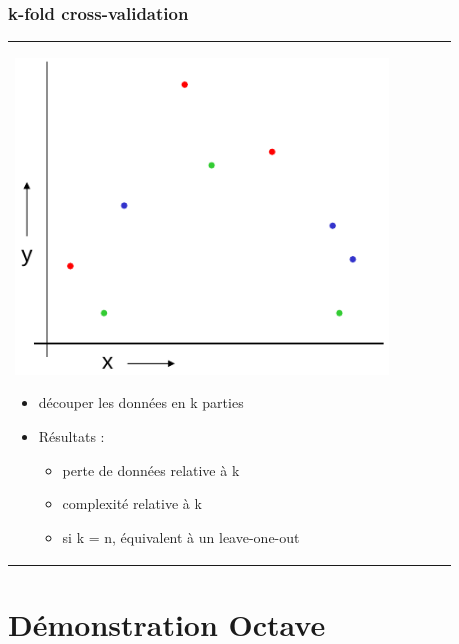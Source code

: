 \documentclass[handout]{beamer}
\begin{document}
		\begin{frame}
		\frametitle{k-fold cross-validation}
		\begin{tabular}{l l}
			\begin{minipage}{0.5\textwidth}
				\begin{center}
					\includegraphics[width=0.9\textwidth]{images/k-fold.png}
				\end{center}
			\end{minipage}

			\begin{minipage}{0.5\textwidth}
				\begin{itemize}
					\item découper les données en k parties
					\item Résultats :
					\begin{itemize}
						\item perte de données relative à k
						\item complexité relative à k
						\item si k = n, équivalent à un leave-one-out
					\end{itemize}
				\end{itemize}
			\end{minipage}

		\end{tabular}
		\end{frame}

	\section{Démonstration Octave}
\end{document}
